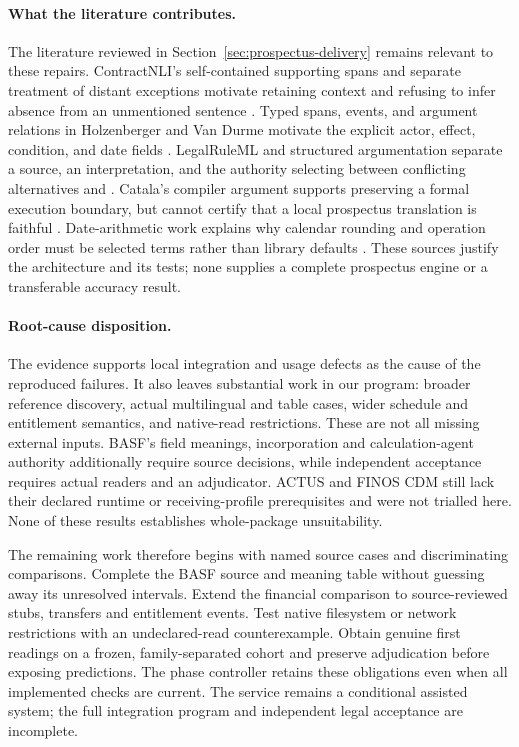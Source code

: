 \paragraph{What the literature contributes.}
The literature reviewed in Section~\ref{sec:prospectus-delivery} remains relevant
to these repairs.  ContractNLI's self-contained supporting spans and
separate treatment of distant exceptions motivate retaining context and refusing
to infer absence from an unmentioned sentence \cite[Sections 2--5 and
Appendix A.1]{contractnli2021}.  Typed spans, events, and argument relations in
Holzenberger and Van Durme motivate the explicit actor, effect, condition, and
date fields \cite[Sections 3--5 and Appendices B, D and E]{connecting2023}.
LegalRuleML and structured argumentation separate a source, an interpretation,
and the authority selecting between conflicting alternatives
\cite[Sections 3--4]{legalinterpretations2014} and
\cite[Sections 3 and 6]{aspic2010}.
Catala's compiler argument supports preserving a formal execution boundary, but
cannot certify that a local prospectus translation is faithful
\cite[Sections 4.1, 4.4--4.5 and 6.1]{catala2021}.  Date-arithmetic work explains
why calendar rounding and operation order must be selected terms rather than
library defaults \cite[Sections 2, 3.2 and 4.3]{dates2024}.  These sources justify
the architecture and its tests; none supplies a complete prospectus engine or
a transferable accuracy result.

\paragraph{Root-cause disposition.}
The evidence supports local integration and usage defects as the cause of the
reproduced failures.  It also leaves substantial work in our program: broader
reference discovery, actual multilingual and table cases, wider schedule and
entitlement semantics, and native-read restrictions.  These are not all missing
external inputs.  BASF's field meanings, incorporation and calculation-agent
authority additionally require source decisions, while independent acceptance
requires actual readers and an adjudicator.  ACTUS and FINOS CDM still lack their
declared runtime or receiving-profile prerequisites and were not trialled here.
None of these results establishes whole-package unsuitability.

The remaining work therefore begins with named source cases and discriminating
comparisons.  Complete the BASF source and meaning table without guessing away
its unresolved intervals.  Extend the financial comparison to source-reviewed
stubs, transfers and entitlement events.  Test native filesystem or network
restrictions with an undeclared-read counterexample.  Obtain genuine first
readings on a frozen, family-separated cohort and preserve adjudication before
exposing predictions.  The phase controller retains these obligations even
when all implemented checks are current.  The service remains a conditional
assisted system; the full integration program and independent legal acceptance
are incomplete.

